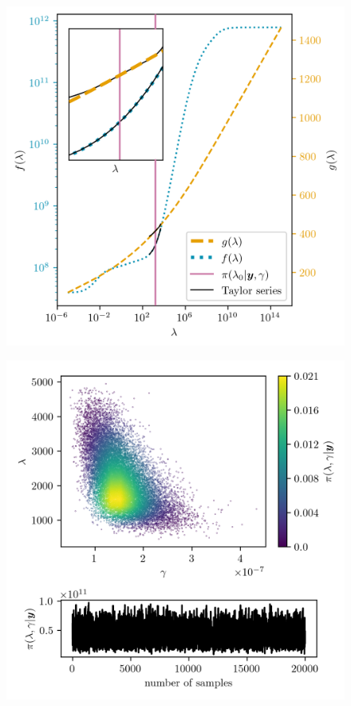 \begin{figure}[ht!]
	\centering
	\includegraphics{f_and_g_phd.png}
	\caption[]{}
	\label{fig:fandg}
\end{figure}


\begin{figure}[ht!]
	\centering
	\includegraphics{ScatterplusHistoPlusTT.png}
	\caption[]{}
	\label{fig:ScatterPlotTT}
\end{figure}


